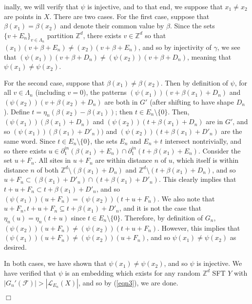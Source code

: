 \documentclass[12pt]{amsart}
\theoremstyle{definition}
\newenvironment{ProofOfEmbeddingThm}[1]
{\par\vskip2\parsep\noindent{\sc Proof of Theorem\ \ref{Thm:Embeddings}. }}{{\hfill
$\Box$}
\par\vskip2\parsep}
\begin{document}
\begin{ProofOfEmbeddingThm}
Finally, we will verify that $\psi$ is injective, and to that end, we suppose that $x_1 \neq x_2$ are points in $X$. There are two cases. For the first case, suppose that $\beta(x_1) = \beta(x_2)$ and denote their common value by $\beta$. Since the sets $\{v + E_n\}_{v \in \Lambda_n}$ partition $\mathbb{Z}^d$, there exists $v \in \mathbb{Z}^d$ so that $(x_1)(v + \beta + E_n) \neq (x_2)(v + \beta + E_n)$, and so by injectivity of $\gamma$, we see that $(\psi(x_1))(v + \beta + D_n) \neq (\psi(x_2))(v + \beta + D_n)$, meaning that $\psi(x_1) \neq \psi(x_2)$. 

For the second case, suppose that $\beta(x_1) \neq \beta(x_2)$. Then by definition of $\psi$, for all $v \in \Lambda_n$ (including $v = 0$), the patterns $(\psi(x_1))(v + \beta(x_1) + D_n)$ and $(\psi(x_2))(v + \beta(x_2) + D_n)$ are both in $G'$ (after shifting to have shape $D_n$). Define $t = \eta_n(\beta(x_2) - \beta(x_1))$; then $t \in E_n \setminus \{0\}$. Then, $(\psi(x_1))(\beta(x_1) + D_n)$ and $(\psi(x_2))(t + \beta(x_1) + D_n)$ are in $G'$, and so $(\psi(x_1))(\beta(x_1) + D'_n))$ and $(\psi(x_2))(t + \beta(x_1) + D'_n)$ are the same word. Since $t \in E_n \setminus \{0\}$, the sets $E_n$ and $E_n + t$ intersect nontrivially, and so there exists $u \in \partial^{in}_1(\beta(x_1) + E_n) \cap \partial^{in}_1(t + \beta(x_1) + E_n)$. Consider the set $u + F_n$. All sites in $u + F_n$ are within distance $n$ of $u$, which itself is within distance $n$ of both $\mathbb{Z}^d \setminus(\beta(x_1) + D_n)$ and $\mathbb{Z}^d \setminus(t + \beta(x_1) + D_n)$, and so $u + F_n \subset (\beta(x_1) + D'_n) \cap (t + \beta(x_1) + D'_n)$. This clearly implies that $t + u + F_n \subset t + \beta(x_1) + D'_n$, and so $(\psi(x_1))(u + F_n) = (\psi(x_2))(t + u + F_n)$. We also note that $u + F_n, t + u + F_n \subseteq t + \beta(x_1) + D'_n$, and it is not the case that $\eta_n(u) = \eta_n(t + u)$ since $t \in E_n \setminus \{0\}$. Therefore, by definition of $G_n$, 
$(\psi(x_2))(u + F_n) \neq (\psi(x_2))(t + u + F_n)$. However, this implies that $(\psi(x_1))(u + F_n) \neq (\psi(x_2))(u + F_n)$, and so $\psi(x_1) \neq \psi(x_2)$ as desired. 

In both cases, we have shown that $\psi(x_1) \neq \psi(x_2)$, and so $\psi$ is injective. We have verified that $\psi$ is an embedding which exists for any random $\mathbb{Z}^d$ SFT $Y$ with $|G_n'(\mathcal{F})| > |\mathcal{L}_{E_n}(X)|$, and so by (\ref{eqn3}), we are done.

\end{ProofOfEmbeddingThm}
\end{document}
